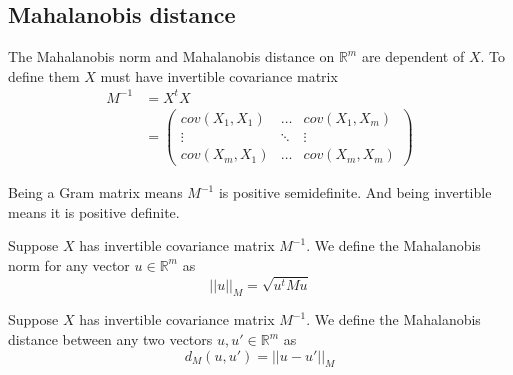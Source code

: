 \documentclass[11pt]{amsart}
\theoremstyle{definition}
\begin{document}
\subsection{Mahalanobis distance} \label{Mahalanobis_distance} The Mahalanobis norm and Mahalanobis distance on $\mathbb{R}^m$ are dependent of $X$. To define them $X$ must have invertible covariance matrix
\begin{align*}
M^{-1} & = X^t X \\
 & = \left( \begin{array}{ccc} cov(X_1, X_1) & \dots & cov(X_1, X_m) \\ \vdots & \ddots & \vdots \\ cov(X_m, X_1) & \dots & cov(X_m, X_m) \end{array} \right)
\end{align*}

Being a Gram matrix means $M^{-1}$ is positive semidefinite. And being invertible means it is positive definite.

\dfn \label{define_Mahalanobis_norm} Suppose $X$ has invertible covariance matrix $M^{-1}$. We define the Mahalanobis norm for any vector $u \in \mathbb{R}^m$ as
$$||u||_M = \sqrt{u^t M u}$$

\dfn \label{define_Mahalanobis_distance} Suppose $X$ has invertible covariance matrix $M^{-1}$. We define the Mahalanobis distance between any two vectors $u, u' \in \mathbb{R}^m$ as
$$d_M(u, u') = ||u - u'||_M$$
\end{document}
